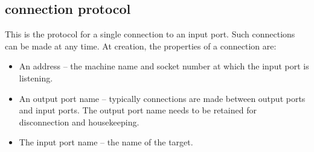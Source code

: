 \subsection{connection protocol}

This is the protocol for a single connection to an input port.
Such connections can be made at any time.  At creation,
the properties of a connection are:

\begin{itemize}

\item An address -- the machine name and socket number at which
the input port is listening.

\item An output port name -- typically connections are made
between output ports and input ports.  The output port name
needs to be retained for disconnection and housekeeping.

\item The input port name -- the name of the target.

\end{itemize}


